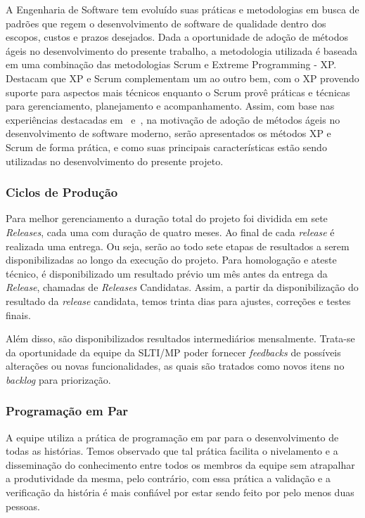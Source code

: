 A Engenharia de Software tem evoluído suas práticas e metodologias em busca de padrões que regem o desenvolvimento de software de qualidade dentro dos escopos, custos e prazos desejados. 
%
Dada a oportunidade de adoção de métodos ágeis no desenvolvimento do presente trabalho, a 
metodologia utilizada é baseada em uma combinação das metodologias Scrum e Extreme Programming - XP. Destacam que XP e Scrum complementam um ao outro bem, com o XP provendo suporte para aspectos mais técnicos enquanto o Scrum provê práticas e técnicas para gerenciamento, planejamento e acompanhamento. Assim, com base nas experiências destacadas em~\cite{schwaber2001} e~\cite{fitzgerald2006}, na motivação de adoção de métodos ágeis no desenvolvimento de software moderno, serão apresentados os métodos XP e Scrum de forma prática, e como suas principais características estão sendo utilizadas no desenvolvimento do presente projeto.


\subsubsection{Ciclos de Produção}

Para melhor gerenciamento a duração total do projeto foi dividida em sete \textit{Releases}, cada uma com duração de quatro meses. Ao final de cada \textit{release} é realizada uma entrega. Ou seja, serão ao todo sete etapas de resultados a serem disponibilizadas ao longo da execução do projeto.
Para homologação e ateste técnico, é disponibilizado um resultado prévio um mês antes da entrega da \textit{Release}, chamadas de \textit{Releases} Candidatas. Assim, a partir da disponibilização do resultado da \textit{release} candidata, temos trinta dias para ajustes, correções e testes finais. 

Além disso, são disponibilizados resultados intermediários mensalmente. Trata-se da oportunidade da equipe da SLTI/MP poder fornecer \textit{feedbacks} de possíveis alterações ou novas funcionalidades, as quais são tratados como novos itens no \textit{backlog} para priorização.


\subsubsection{Programação em Par}

A equipe utiliza a prática de programação em par para o desenvolvimento de todas as histórias. Temos observado que tal prática facilita o nivelamento e a disseminação do conhecimento entre todos os membros da equipe sem atrapalhar a produtividade da mesma, pelo contrário, com essa prática a validação e a verificação da história é mais confiável por estar sendo feito por pelo menos duas pessoas.


